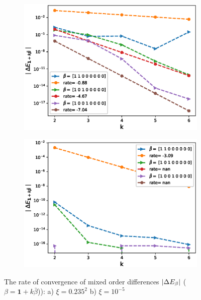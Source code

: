 \documentclass[11pt]{article}
\begin{document}
\begin{figure}[h!]
\centering
\begin{subfigure}{.5\textwidth}
\centering
\includegraphics[width=1\linewidth]{./figures/effect_rho_differences/H_0_43_K_0_8/N_4/mixed_difference_order2_rbergomi_4steps_H_043_K_0_8_rho__0_9_with_rate_W1}
\caption{}
\label{fig:sub3}
\end{subfigure}%
\begin{subfigure}{.5\textwidth}
\centering
\includegraphics[width=1\linewidth]{./figures/effect_xi_differences/H_0_43_K_0_8/N_4/mixed_difference_order2_rbergomi_4steps_H_043_K_0_8_xi_10__5_with_rate_W1}
\caption{}
\label{fig:sub4}
\end{subfigure}

\caption{The rate of convergence of  mixed order differences $\left\lvert\Delta E_{\beta}\right\rvert$ ($\beta=\mathbf{1}+k \bar{\beta}$)): a) $\xi=0.235^2$ b)  $\xi=10^{-5}$}
\label{fig:test2}
\end{figure}
\end{document}
